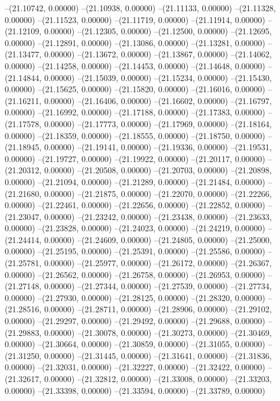 --(21.10742, 0.00000)
--(21.10938, 0.00000)
--(21.11133, 0.00000)
--(21.11328, 0.00000)
--(21.11523, 0.00000)
--(21.11719, 0.00000)
--(21.11914, 0.00000)
--(21.12109, 0.00000)
--(21.12305, 0.00000)
--(21.12500, 0.00000)
--(21.12695, 0.00000)
--(21.12891, 0.00000)
--(21.13086, 0.00000)
--(21.13281, 0.00000)
--(21.13477, 0.00000)
--(21.13672, 0.00000)
--(21.13867, 0.00000)
--(21.14062, 0.00000)
--(21.14258, 0.00000)
--(21.14453, 0.00000)
--(21.14648, 0.00000)
--(21.14844, 0.00000)
--(21.15039, 0.00000)
--(21.15234, 0.00000)
--(21.15430, 0.00000)
--(21.15625, 0.00000)
--(21.15820, 0.00000)
--(21.16016, 0.00000)
--(21.16211, 0.00000)
--(21.16406, 0.00000)
--(21.16602, 0.00000)
--(21.16797, 0.00000)
--(21.16992, 0.00000)
--(21.17188, 0.00000)
--(21.17383, 0.00000)
--(21.17578, 0.00000)
--(21.17773, 0.00000)
--(21.17969, 0.00000)
--(21.18164, 0.00000)
--(21.18359, 0.00000)
--(21.18555, 0.00000)
--(21.18750, 0.00000)
--(21.18945, 0.00000)
--(21.19141, 0.00000)
--(21.19336, 0.00000)
--(21.19531, 0.00000)
--(21.19727, 0.00000)
--(21.19922, 0.00000)
--(21.20117, 0.00000)
--(21.20312, 0.00000)
--(21.20508, 0.00000)
--(21.20703, 0.00000)
--(21.20898, 0.00000)
--(21.21094, 0.00000)
--(21.21289, 0.00000)
--(21.21484, 0.00000)
--(21.21680, 0.00000)
--(21.21875, 0.00000)
--(21.22070, 0.00000)
--(21.22266, 0.00000)
--(21.22461, 0.00000)
--(21.22656, 0.00000)
--(21.22852, 0.00000)
--(21.23047, 0.00000)
--(21.23242, 0.00000)
--(21.23438, 0.00000)
--(21.23633, 0.00000)
--(21.23828, 0.00000)
--(21.24023, 0.00000)
--(21.24219, 0.00000)
--(21.24414, 0.00000)
--(21.24609, 0.00000)
--(21.24805, 0.00000)
--(21.25000, 0.00000)
--(21.25195, 0.00000)
--(21.25391, 0.00000)
--(21.25586, 0.00000)
--(21.25781, 0.00000)
--(21.25977, 0.00000)
--(21.26172, 0.00000)
--(21.26367, 0.00000)
--(21.26562, 0.00000)
--(21.26758, 0.00000)
--(21.26953, 0.00000)
--(21.27148, 0.00000)
--(21.27344, 0.00000)
--(21.27539, 0.00000)
--(21.27734, 0.00000)
--(21.27930, 0.00000)
--(21.28125, 0.00000)
--(21.28320, 0.00000)
--(21.28516, 0.00000)
--(21.28711, 0.00000)
--(21.28906, 0.00000)
--(21.29102, 0.00000)
--(21.29297, 0.00000)
--(21.29492, 0.00000)
--(21.29688, 0.00000)
--(21.29883, 0.00000)
--(21.30078, 0.00000)
--(21.30273, 0.00000)
--(21.30469, 0.00000)
--(21.30664, 0.00000)
--(21.30859, 0.00000)
--(21.31055, 0.00000)
--(21.31250, 0.00000)
--(21.31445, 0.00000)
--(21.31641, 0.00000)
--(21.31836, 0.00000)
--(21.32031, 0.00000)
--(21.32227, 0.00000)
--(21.32422, 0.00000)
--(21.32617, 0.00000)
--(21.32812, 0.00000)
--(21.33008, 0.00000)
--(21.33203, 0.00000)
--(21.33398, 0.00000)
--(21.33594, 0.00000)
--(21.33789, 0.00000)
